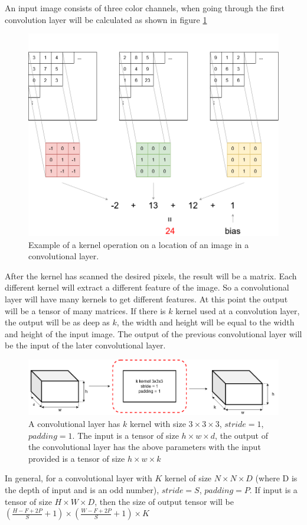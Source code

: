 \documentclass[conference]{IEEEtran}
\begin{document}
An input image consists of three color channels, when going through the first convolution layer will be calculated as shown in figure \ref{fig:kernel_calculation}
\begin{figure}[ht!]
	\centerline{\includegraphics[scale=0.3]{images/kernel_calculation.png}}
  	\caption{Example of a kernel operation on a location of an image in a convolutional layer.}
  	\label{fig:kernel_calculation}
\end{figure}
After the kernel has scanned the desired pixels, the result will be a matrix. Each different kernel will extract a different feature of the image. So a convolutional layer will have many kernels to get different features. At this point the output will be a tensor of many matrices. If there is $ k $ kernel used at a convolution layer, the output will be as deep as $ k $, the width and height will be equal to the width and height of the input image. The output of the previous convolutional layer will be the input of the later convolutional layer.
\begin{figure}[ht]
	\centerline{\includegraphics[scale=0.22]{images/convol_layer_in_out.png}}
  	\caption{A convolutional layer has $ k $ kernel with size $ 3 \times 3 \times 3 $, $ stride = 1 $, $ padding = 1 $. The input is a tensor of size $ h \times w \times d $, the output of the convolutional layer has the above parameters with the input provided is a tensor of size $ h \times w \times k $}
  	\label{fig:convol_layer_in_out}
\end{figure}
In general, for a convolutional layer with $ K $ kernel of size $ N \times N \times D $ (where D is the depth of input and is an odd number), $ stride = S $, $ padding = P $. If input is a tensor of size $ H \times W \times D $, then the size of output tensor will be
$\left( 
	\frac
		{{H-F+2P}}
		{S}
	+1
\right)
\times
\left( 
	\frac
		{{W-F+2P}}
		{S}
	+1
\right)
\times
K$
\end{document}
